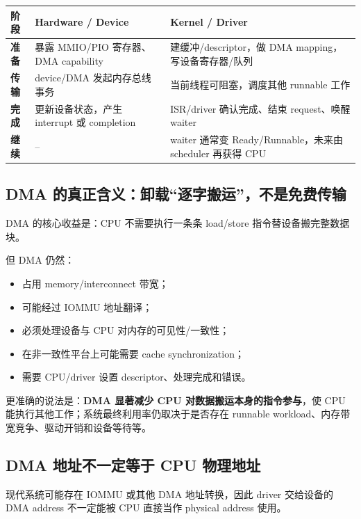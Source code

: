 \documentclass[11pt,a4paper]{ctexart}
\newcommand{\kw}[1]{\textbf{#1}}
\begin{document}
\begin{center}
\begin{tabularx}{\textwidth}{>{\bfseries}p{2.7cm}X X}
\toprule
阶段 & Hardware / Device & Kernel / Driver\\
\midrule
准备 & 暴露 MMIO/PIO 寄存器、DMA capability & 建缓冲/descriptor，做 DMA mapping，写设备寄存器/队列\\
传输 & device/DMA 发起内存总线事务 & 当前线程可阻塞，调度其他 runnable 工作\\
完成 & 更新设备状态，产生 interrupt 或 completion & ISR/driver 确认完成、结束 request、唤醒 waiter\\
继续 & -- & waiter 通常变 Ready/Runnable，未来由 scheduler 再获得 CPU\\
\bottomrule
\end{tabularx}
\end{center}

\subsection{DMA 的真正含义：卸载“逐字搬运”，不是免费传输}
DMA 的核心收益是：CPU 不需要执行一条条 load/store 指令替设备搬完整数据块。

但 DMA 仍然：
\begin{itemize}
  \item 占用 memory/interconnect 带宽；
  \item 可能经过 IOMMU 地址翻译；
  \item 必须处理设备与 CPU 对内存的可见性/一致性；
  \item 在非一致性平台上可能需要 cache synchronization；
  \item 需要 CPU/driver 设置 descriptor、处理完成和错误。
\end{itemize}

\begin{warn}
更准确的说法是：\kw{DMA 显著减少 CPU 对数据搬运本身的指令参与}，使 CPU 能执行其他工作；系统最终利用率仍取决于是否存在 runnable workload、内存带宽竞争、驱动开销和设备等待等。
\end{warn}

\subsection{DMA 地址不一定等于 CPU 物理地址}
现代系统可能存在 IOMMU 或其他 DMA 地址转换，因此 driver 交给设备的 DMA address 不一定能被 CPU 直接当作 physical address 使用。
\end{document}
